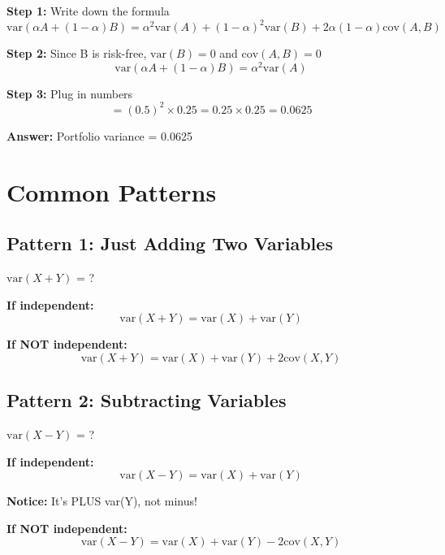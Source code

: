 \documentclass[12pt]{article}
\begin{document}
\textbf{Step 1:} Write down the formula
\[
\text{var}(\alpha A + (1-\alpha)B) = \alpha^2\text{var}(A) + (1-\alpha)^2\text{var}(B) + 2\alpha(1-\alpha)\text{cov}(A,B)
\]

\textbf{Step 2:} Since B is risk-free, $\text{var}(B) = 0$ and $\text{cov}(A,B) = 0$
\[
\text{var}(\alpha A + (1-\alpha)B) = \alpha^2\text{var}(A)
\]

\textbf{Step 3:} Plug in numbers
\[
= (0.5)^2 \times 0.25 = 0.25 \times 0.25 = 0.0625
\]

\textbf{Answer:} Portfolio variance = 0.0625

\newpage

\section*{\Large Common Patterns}

\subsection*{\large Pattern 1: Just Adding Two Variables}

\begin{center}
\Large
$\text{var}(X + Y)$ = ?
\end{center}

\vspace{1em}

\textbf{If independent:}
\[
\text{var}(X + Y) = \text{var}(X) + \text{var}(Y)
\]

\textbf{If NOT independent:}
\[
\text{var}(X + Y) = \text{var}(X) + \text{var}(Y) + 2\text{cov}(X,Y)
\]

\vspace{2em}

\subsection*{\large Pattern 2: Subtracting Variables}

\begin{center}
\Large
$\text{var}(X - Y)$ = ?
\end{center}

\vspace{1em}

\textbf{If independent:}
\[
\text{var}(X - Y) = \text{var}(X) + \text{var}(Y)
\]

\textbf{Notice:} It's PLUS var(Y), not minus!

\textbf{If NOT independent:}
\[
\text{var}(X - Y) = \text{var}(X) + \text{var}(Y) - 2\text{cov}(X,Y)
\]
\end{document}
